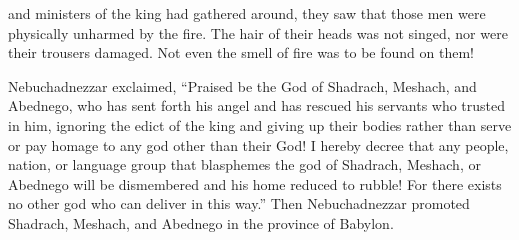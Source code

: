 {and ministers
of the king
had gathered around,
they saw
that
those
men
were physically
unharmed
by the fire.
The hair
of their heads
was not
singed,
nor
were their trousers
damaged.
Not even
the smell
of fire
was to be found on them!
\par }{\PP {}Nebuchadnezzar
exclaimed, “Praised
be the God
of Shadrach,
Meshach,
and Abednego,
who
has sent forth
his angel
and has rescued
his servants
who
trusted
in him, ignoring
the edict
of the king
and giving up
their bodies
rather than
serve
or
pay homage
to any
god
other than
their God!
I hereby
decree
that
any
people,
nation,
or language group
that
blasphemes
the god
of Shadrach,
Meshach,
or Abednego
will be dismembered
and his home
reduced
to rubble! For
there
exists
no
other
god
who
can
deliver
in this way.”
Then
Nebuchadnezzar
promoted
Shadrach,
Meshach,
and Abednego
in the province
of Babylon.


}
